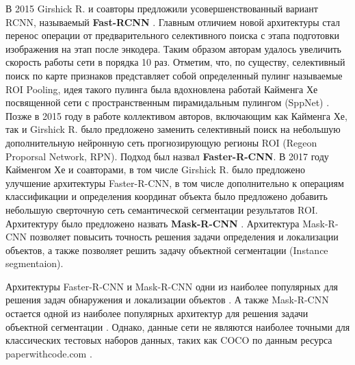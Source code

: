 \documentclass[12pt]{article}
\begin{document}
\begin{sloppypar}
В 2015 Girshick R. и соавторы предложили усовершенствованный вариант RCNN, называемый \textbf{Fast-RCNN} \cite{girshick2015fast}. Главным отличием новой архитектуры стал перенос операции от предварительного селективного поиска с этапа подготовки изображения на этап после энкодера. Таким образом авторам удалось увеличить скорость работы сети в порядка 10 раз. Отметим, что, по существу, селективный поиск по карте признаков представляет собой определенный пулинг называемые ROI Pooling, идея такого пулинга была вдохновлена работай Кайменга Хе посвященной сети с пространственным пирамидальным пулингом (SppNet) \cite{he2015spatial}. Позже в 2015 году в работе \cite{ren2015faster} коллективом авторов, включающим как Кайменга Хе, так и Girshick R. было предложено заменить селективный поиск на небольшую дополнительную нейронную сеть прогнозирующую регионы ROI (Regeon Proporsal Network, RPN). Подход был назвал \textbf{Faster-R-CNN}. В 2017 году Кайменгом Хе и соавторами, в том числе  Girshick R. было предложено улучшение архитектуры  Faster-R-CNN, в том числе дополнительно к операциям классификации и определения координат объекта было предложено добавить небольшую сверточную сеть семантической сегментации результатов ROI. Архитектуру было предложено назвать \textbf{Mask-R-CNN} \cite{he2017mask}. Архитектура  Mask-R-CNN позволяет повысить точность решения задачи определения и локализации объектов, а также позволяет решить задачу объектной сегментации (Instance segmentaion).  

Архитектуры Faster-R-CNN и Mask-R-CNN одни из наиболее популярных для решения задач обнаружения и локализации объектов \cite{zou2019object}. А также Mask-R-CNN остается одной из наиболее популярных архитектур для решения задачи объектной сегментации \cite{hafiz2020survey}. Однако, данные сети не являются наиболее точными для классических тестовых наборов данных, таких как COCO \cite{lin2014microsoft} по данным ресурса paperwithcode.com \cite{paperswithcodeCOCOdet,paperswithcodeCOCOinst} . 



\end{sloppypar}
\end{document}
